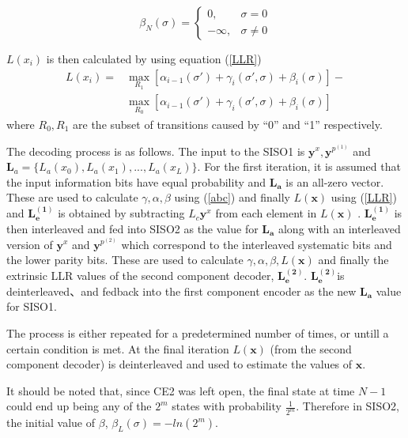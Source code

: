 \documentclass[technicalreport]{ieicej}
\begin{document}
\[
   \beta_N(\sigma)= 
\begin{cases}
   0,& \sigma= 0\\        -\infty,              &  \sigma \neq 0
\end{cases}
\]

$ L(x_i)$ is then calculated by using equation (\ref{LLR})
 \begin{equation}
 \begin{split}
 L(x_i)=&\max_{R_1}[\alpha_{i-1}(\sigma')+ \gamma_i(\sigma',\sigma)+\beta_i(\sigma)]
 -\\
 &\max_{R_0}[\alpha_{i-1}(\sigma')+ \gamma_i(\sigma',\sigma)+\beta_i(\sigma)]
\label{LLR}
\end{split}
\end{equation}
where $R_0,R_1$ are the subset of transitions caused by ``0'' and ``1'' respectively.

  The decoding process is as follows.
The input to the SISO1 is $\mathbf{y}^x,\mathbf{y}^{p^{(1)}}$ 
and $\mathbf{L}_a=\{L_a(x_0),L_a(x_1),...,L_a(x_{L})\}$. 
For the first iteration, it is assumed 
that the input information bits have equal probability and $\mathbf{L_a}$ is an 
all-zero vector.
These are used to calculate $\gamma ,\alpha , \beta$ using (\ref{abc})
 and finally
$ L(\mathbf{x})$ using (\ref{LLR}) and $\mathbf{L_e^{(1)}}$ is obtained by subtracting
 $L_c\mathbf{y}^x$  from each element in $ L(\mathbf{x})$ .
$\mathbf{L_e^{(1)}}$ is then
 interleaved and fed into SISO2 as the value for
 $\mathbf{L_a}$ along with an interleaved version of $\mathbf{y}^{x}$ and 
 $ \mathbf{y}^{p^{(2)}}$ which correspond to
 the interleaved systematic bits and the lower parity bits. These are used to calculate 
 $\gamma,\alpha , 
\beta, L(\mathbf{x})$
 and finally the extrinsic LLR values 
of the second component decoder, $\mathbf{L_e^{(2)}}$.
$\mathbf{L_e^{(2)}}$is deinterleaved、and fedback into the first component encoder
 as the new $\mathbf{L_a}$ value for SISO1.

The process is either repeated for a predetermined number of times, or untill a certain 
condition is met. At the final iteration $ L(\mathbf{x})$ (from the second component
 decoder) is deinterleaved and used to estimate the values of $\mathbf{x}$.
 
  It should be noted that, since CE2 was left open, 
 the final state at time $N-1$ could end up being any of the $2^m$ states with 
 probability $\frac{1}{2^m}$. Therefore in SISO2, the initial
 value of $\beta$, $\beta_L(\sigma)=-ln(2^m)$.
\end{document}
